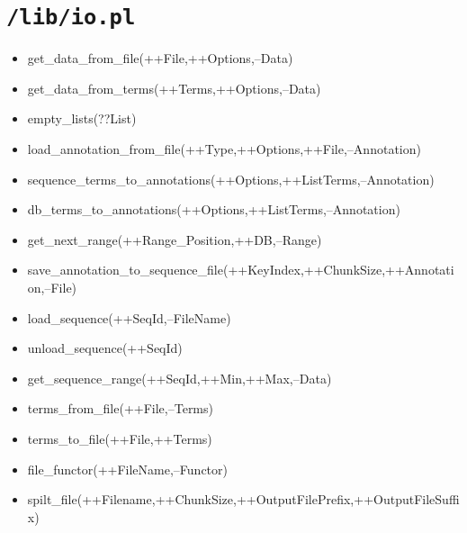 \section{\texttt{/lib/io.pl}}

\begin{itemize}
\item get\_data\_from\_file(++File,++Options,--Data)
\item get\_data\_from\_terms(++Terms,++Options,--Data)
\item empty\_lists(??List)
\item load\_annotation\_from\_file(++Type,++Options,++File,--Annotation)
\item sequence\_terms\_to\_annotations(++Options,++ListTerms,--Annotation)
\item db\_terms\_to\_annotations(++Options,++ListTerms,--Annotation)
\item get\_next\_range(++Range\_Position,++DB,--Range)
\item save\_annotation\_to\_sequence\_file(++KeyIndex,++ChunkSize,++Annotation,--File)
\item load\_sequence(++SeqId,--FileName)
\item unload\_sequence(++SeqId)
\item get\_sequence\_range(++SeqId,++Min,++Max,--Data)
\item terms\_from\_file(++File,--Terms)
\item terms\_to\_file(++File,++Terms)
\item file\_functor(++FileName,--Functor)
\item spilt\_file(++Filename,++ChunkSize,++OutputFilePrefix,++OutputFileSuffix)
\end{itemize}



